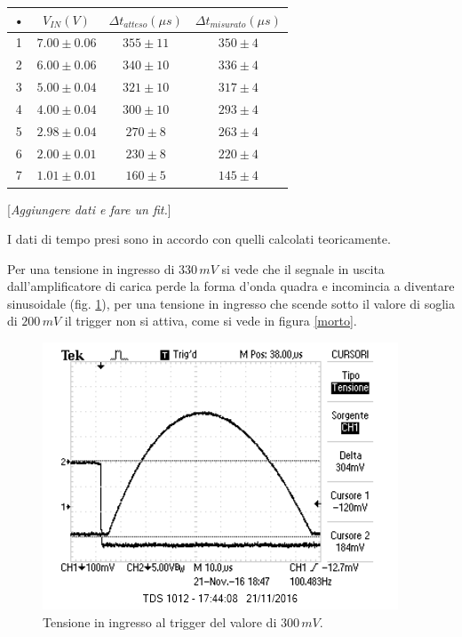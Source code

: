 \documentclass[10pt,a4paper]{article}
\newcommand{\rem}[1]{[\emph{#1}]}
\begin{document}
\begin{table}[!ht]
\centering
\begin{tabular}{|c|c|c|c|}
\hline 
• & $V_{IN} (V)$ & $\Delta t _ {atteso} (\mu s)$ & $\Delta t _ {misurato} (\mu s)$ \\ 
\hline
1 & $7.00 \pm 0.06$ & $355 \pm 11$ & $350 \pm 4$ \\
2 & $6.00 \pm 0.06$ & $340 \pm 10$ & $336 \pm 4$ \\  
3 & $5.00 \pm 0.04$ & $321 \pm 10$ & $317 \pm 4$ \\  
4 & $4.00 \pm 0.04$ & $300 \pm 10$ & $293 \pm 4$ \\ 
5 & $2.98 \pm 0.04$ & $270 \pm 8$ & $263 \pm 4$ \\ 
6 & $2.00 \pm 0.01$ & $230 \pm 8$ & $220 \pm 4$ \\ 
7 & $1.01 \pm 0.01$ & $160 \pm 5$ & $145 \pm 4$ \\   
\hline 
\end{tabular} 
\label{dati}
\end{table}


\rem{Aggiungere dati e fare un fit.}

I dati di tempo presi sono in accordo con quelli calcolati teoricamente.

Per una tensione in ingresso di $330 \, mV$ si vede che il segnale in uscita dall'amplificatore di carica perde la forma d'onda quadra e incomincia a diventare sinusoidale (fig. \ref{inizamorire}), per una tensione in ingresso che scende sotto il valore di soglia di $200 \, mV$ il trigger non si attiva, come si vede in figura \ref{morto}.

\begin{figure}[h]
\centering
\includegraphics[scale=1.0]{immagini/iniziaamorire.png}
\caption{Tensione in ingresso al trigger del valore di $300 \, mV$.}
\label{inizamorire}
\end{figure}
\end{document}
